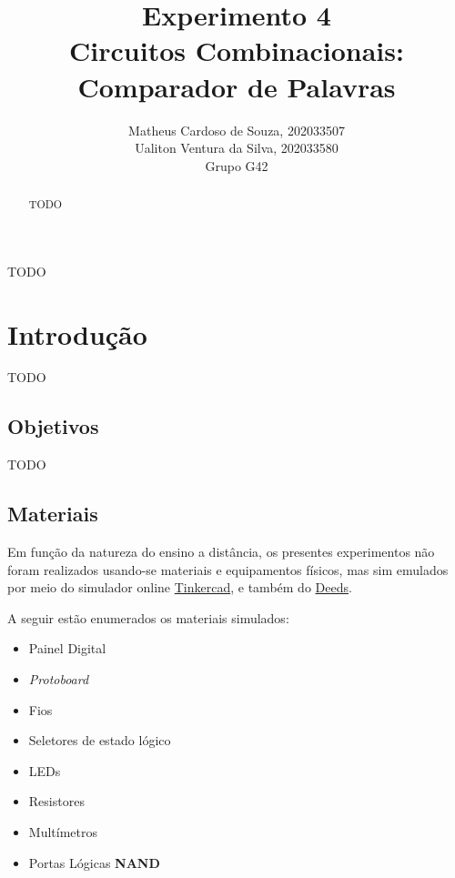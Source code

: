 \documentclass[12pt]{article}
\title{Experimento 4\\
Circuitos Combinacionais: Comparador de Palavras}
\author{Matheus Cardoso de Souza, 202033507\\
        Ualiton Ventura da Silva, 202033580\\
        Grupo G42
}
\begin{document}
\maketitle

 \begin{abstract}
   TODO
 \end{abstract}

 \begin{resumo}
   TODO
 \end{resumo}


\section{Introdução}
\label{sec:Introducao}


TODO

\subsection{Objetivos}
\label{sec:Objetivos}

TODO

\subsection{Materiais}
\label{sec:Materiais}
Em função da natureza do ensino a distância, os presentes experimentos não foram
realizados usando-se materiais e equipamentos físicos, mas sim emulados por meio
do simulador online \href{https://www.tinkercad.com/}{Tinkercad}, e também do
\href{https://www.digitalelectronicsdeeds.com/deeds.html}{Deeds}.

A seguir estão enumerados os materiais simulados:
\begin{itemize}
    \item Painel Digital
    \item \textit{Protoboard}
    \item Fios
    \item Seletores de estado lógico
    \item LEDs
    \item Resistores
    \item Multímetros
    \item Portas Lógicas \textbf{NAND}
\end{itemize}
\end{document}
